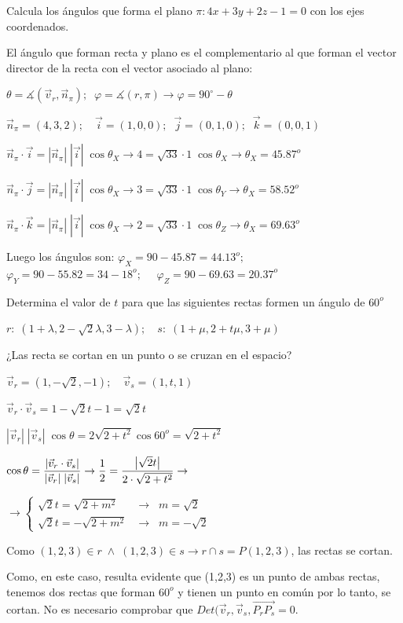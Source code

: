 \begin{ejre}
Calcula los ángulos que forma el plano $\pi: 4x+3y+2z-1=0$ con los ejes coordenados.	
\end{ejre}
\begin{proofw}\renewcommand{\qedsymbol}{$\diamond$}
\noindent El ángulo que forman recta y plano es el complementario al que forman el vector director de la recta con el vector asociado al plano: 

\noindent $\theta=\measuredangle (\vec v_r,\vec n_{\pi}) ; \;\; \varphi = \measuredangle (r,\pi) \to \varphi=90^{\circ}-\theta$

\noindent 	$\vec n_{\pi}=(4,3,2); \quad \vec i=(1,0,0);\;\; \vec j=(0,1,0);\;\; \vec k=(0,0,1)$

\noindent $\vec n_{\pi}\cdot \vec i = |\vec n_{\pi}|\;|\vec i|\; \cos \theta_X \to 4=\sqrt{33}\cdot 1 \; \cos \theta_X \to \theta_X=45.87^o$

\noindent $\vec n_{\pi}\cdot \vec j = |\vec n_{\pi}|\;|\vec i|\; \cos \theta_X \to 3=\sqrt{33}\cdot 1 \; \cos \theta_Y \to \theta_X=58.52^o$

\noindent $\vec n_{\pi}\cdot \vec k = |\vec n_{\pi}|\;|\vec i|\; \cos \theta_X \to 2=\sqrt{33}\cdot 1 \; \cos \theta_Z \to \theta_X=69.63^o$

\noindent Luego los ángulos son:  $\varphi_X=90-45.87=44.13^o;\quad$ 
$\varphi_Y=90-55.82=34-18^o;\quad$ 
$\varphi_Z=90-69.63=20.37^o$ 
\end{proofw}

\begin{ejre} Determina el valor de $t$ para que las siguientes rectas formen un ángulo de $60^o$	

$r:\; (1+\lambda,2-\sqrt{2}\lambda,3-\lambda); \quad s:\;(1+\mu, 2+t\mu,3+\mu)$

¿Las recta se cortan en un punto o se cruzan en el espacio?
\end{ejre}
\begin{proofw}\renewcommand{\qedsymbol}{$\diamond$}	
\noindent	$\vec v_r=(1,-\sqrt{2},-1);\quad \vec v_s=(1,t,1)$

\noindent $\vec v_r \cdot \vec v_s=1-\sqrt{2}t-1=\sqrt{2}t$

\noindent $|\vec v_r|\;|\vec v_s|\;\cos \theta=2\sqrt{2+t^2}\cos 60^o=\sqrt{2+t^2}$

\noindent $\cos \theta = \dfrac {\abs{\vec v_r \cdot \vec v_s}}{|\vec v_r|\;|\vec v_s|}\to \dfrac 1 2 = \dfrac {\abs{\sqrt{2}t}}{2\cdot \sqrt{2+t^2}} \to $

\noindent $\to \begin{cases} \sqrt{2}t=\sqrt{2+m^2} &\to\;\; m=\sqrt{2} \\ \sqrt{2}t=-\sqrt{2+m^2} &\to\;\; m=-\sqrt{2} \end{cases}$

\noindent Como $(1,2,3)\in r\;\wedge \; (1,2,3)\in s \to r\cap s=P(1,2,3)$, las rectas se cortan.

\noindent \textcolor{gris}{Como, en este caso, resulta evidente que (1,2,3) es un punto de ambas rectas, tenemos dos rectas que forman $60^o$ y tienen un punto en común por lo tanto, se cortan. No es necesario comprobar que $Det(\vec v_r, \vec v_s, \overrightarrow{P_rP_s}=0$.}
\end{proofw}

